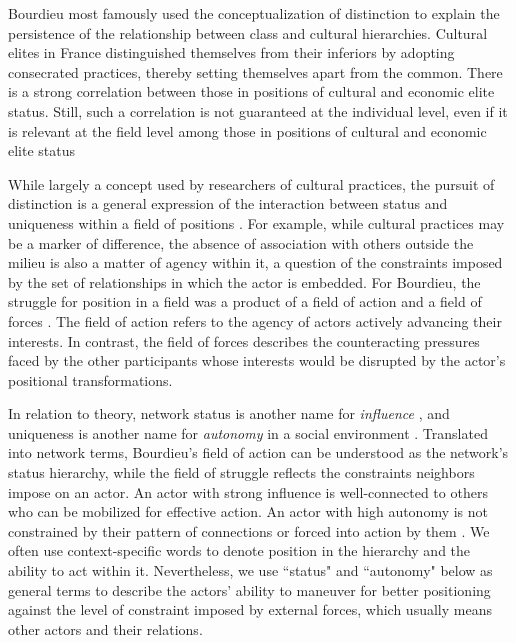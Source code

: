 \documentclass[12pt]{article}
\begin{document}
Bourdieu \citeyearpar{bourdieu1984distinction} most famously used the conceptualization of distinction to explain the persistence of the relationship between class and cultural hierarchies. Cultural elites in France distinguished themselves from their inferiors by adopting consecrated practices, thereby setting themselves apart from the common. There is a strong correlation between those in positions of cultural and economic elite status. Still, such a correlation is not guaranteed at the individual level, even if it is relevant at the field level among those in positions of cultural and economic elite status  

While largely a concept used by researchers of cultural practices, the pursuit of distinction is a general expression of the interaction between status and uniqueness within a field of positions \citep{anheier1995forms}. For example, while cultural practices may be a marker of difference, the absence of association with others outside the milieu is also a matter of agency within it, a question of the constraints imposed by the set of relationships in which the actor is embedded. For Bourdieu, the struggle for position in a field was a product of a field of action and a field of forces \citep{martin2003field}. The field of action refers to the agency of actors actively advancing their interests. In contrast, the field of forces describes the counteracting pressures faced by the other participants whose interests would be disrupted by the actor's positional transformations.   

In relation to theory, network status is another name for \textit{influence} \citep{friedkin1991theoretical}, and uniqueness is another name for \textit{autonomy} in a social environment \citep{burt1980autonomy}. Translated into network terms, Bourdieu's field of action can be understood as the network's status hierarchy, while the field of struggle reflects the constraints neighbors impose on an actor. An actor with strong influence is well-connected to others who can be mobilized for effective action. An actor with high autonomy is not constrained by their pattern of connections or forced into action by them \citep{burt76}. We often use context-specific words to denote position in the hierarchy and the ability to act within it. Nevertheless, we use ``status" and ``autonomy" below as general terms to describe the actors' ability to maneuver for better positioning against the level of constraint imposed by external forces, which usually means other actors and their relations.
\end{document}

